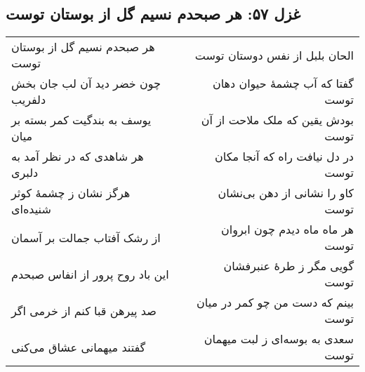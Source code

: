 \begin{center}
\section*{غزل ۵۷: هر صبحدم نسیم گل از بوستان توست}
\label{sec:057}
\begin{longtable}{l p{0.5cm} r}
هر صبحدم نسیم گل از بوستان توست
&&
الحان بلبل از نفس دوستان توست
\\
چون خضر دید آن لب جان بخش دلفریب
&&
گفتا که آب چشمهٔ حیوان دهان توست
\\
یوسف به بندگیت کمر بسته بر میان
&&
بودش یقین که ملک ملاحت از آن توست
\\
هر شاهدی که در نظر آمد به دلبری
&&
در دل نیافت راه که آنجا مکان توست
\\
هرگز نشان ز چشمهٔ کوثر شنیده‌ای
&&
کاو را نشانی از دهن بی‌نشان توست
\\
از رشک آفتاب جمالت بر آسمان
&&
هر ماه ماه دیدم چون ابروان توست
\\
این باد روح پرور از انفاس صبحدم
&&
گویی مگر ز طرهٔ عنبرفشان توست
\\
صد پیرهن قبا کنم از خرمی اگر
&&
بینم که دست من چو کمر در میان توست
\\
گفتند میهمانی عشاق می‌کنی
&&
سعدی به بوسه‌ای ز لبت میهمان توست
\\
\end{longtable}
\end{center}
